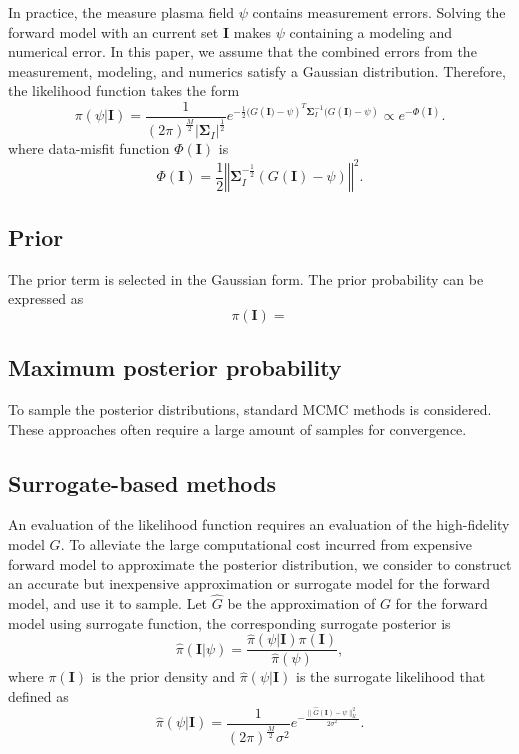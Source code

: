 In practice, the measure plasma field $\psi$ contains measurement errors. Solving the forward model with an current set $\boldsymbol{I}$ makes $\psi$ containing a modeling and numerical error. In this paper, we assume that the combined errors from the measurement, modeling, and numerics satisfy a Gaussian distribution. Therefore, the likelihood function takes the form
%
\begin{equation}\label{eq:likelihood_density}
      \pi(\psi|\boldsymbol{I}) = \frac{1}{(2\pi)^{\frac M 2} |\boldsymbol{\Sigma}_I|^{\frac 1 2}}e^{-\frac{1}{2}(G\left(\boldsymbol{I}) - \psi\right)^T \boldsymbol{\Sigma}_I^{-1}(G\left(\boldsymbol{I}) - \psi\right)}\propto e^{-\Phi(\boldsymbol{I})}.
\end{equation}
%
where data-misfit function $\Phi(\boldsymbol{I})$ is
%
\[
\Phi(\boldsymbol{I}) = \frac{1}{2}\left\Vert \boldsymbol{\Sigma}_I^{-\frac{1}{2}}(G(\boldsymbol{I}) - \psi)\right\Vert^2.
\]
%

\subsection{Prior}
The prior term is selected in the Gaussian form. The prior probability can be expressed as
\begin{equation}\label{eq:prior_density}
    \pi(\boldsymbol{I}) = 
\end{equation}


\subsection{Maximum posterior probability}

To sample the posterior distributions, standard MCMC methods is considered. These approaches often require a large amount of samples for convergence.

\subsection{Surrogate-based methods}
An evaluation of the likelihood function requires an evaluation of the high-fidelity model $G$. To alleviate the large computational cost incurred from expensive forward model to approximate the posterior distribution, we consider to construct an accurate but inexpensive approximation or surrogate model for the forward model, and use it to sample. Let $\widehat G$ be the approximation of $G$ for the forward model using surrogate function, the corresponding surrogate posterior is
%
\[
\widehat \pi(\boldsymbol{I}|\psi) = \frac{ \widehat\pi(\psi|\boldsymbol{I})\pi \left(\boldsymbol{I}\right)}{\widehat\pi (\psi)},
\]
where $\pi \left(\boldsymbol{I}\right)$ is the prior density and $\widehat\pi(\psi|\boldsymbol{I})$ is the surrogate likelihood that defined as
%
\[
 \widehat\pi(\psi|\boldsymbol{I}) = \frac{1}{(2\pi)^{\frac{M}{2}} \sigma^2}e^{-\frac{\|\widehat G(\boldsymbol{I}) - \psi\|_\mathcal{U}^2}{2\sigma^2}}.
\]
%


